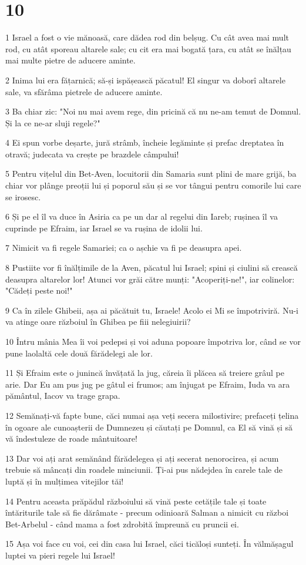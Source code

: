 \chapter{10}

\par 1 Israel a fost o vie mănoasă, care dădea rod din belșug. Cu cât avea mai mult rod, cu atât sporeau altarele sale; cu cit era mai bogată țara, cu atât se înălțau mai multe pietre de aducere aminte.
\par 2 Inima lui era fățarnică; să-și ispășească păcatul! El singur va doborî altarele sale, va sfărâma pietrele de aducere aminte.
\par 3 Ba chiar zic: "Noi nu mai avem rege, din pricină că nu ne-am temut de Domnul. Și la ce ne-ar sluji regele?"
\par 4 Ei spun vorbe deșarte, jură strâmb, încheie legăminte și prefac dreptatea în otravă; judecata va crește pe brazdele câmpului!
\par 5 Pentru vițelul din Bet-Aven, locuitorii din Samaria sunt plini de mare grijă, ba chiar vor plânge preoții lui și poporul său și se vor tângui pentru comorile lui care se irosesc.
\par 6 Și pe el îl va duce în Asiria ca pe un dar al regelui din Iareb; rușinea îl va cuprinde pe Efraim, iar Israel se va rușina de idolii lui.
\par 7 Nimicit va fi regele Samariei; ca o așchie va fi pe deasupra apei.
\par 8 Pustiite vor fi înălțimile de la Aven, păcatul lui Israel; spini și ciulini să crească deasupra altarelor lor! Atunci vor grăi către munți: "Acoperiți-ne!", iar colinelor: "Cădeți peste noi!"
\par 9 Ca în zilele Ghibeii, așa ai păcătuit tu, Israele! Acolo ei Mi se împotriviră. Nu-i va atinge oare războiul în Ghibea pe fiii nelegiuirii?
\par 10 Întru mânia Mea îi voi pedepsi și voi aduna popoare împotriva lor, când se vor pune laolaltă cele două fărădelegi ale lor.
\par 11 Și Efraim este o junincă învățată la jug, căreia îi plăcea să treiere grâul pe arie. Dar Eu am pus jug pe gâtul ei frumos; am înjugat pe Efraim, Iuda va ara pământul, Iacov va trage grapa.
\par 12 Semănați-vă fapte bune, căci numai așa veți secera milostivire; prefaceți țelina în ogoare ale cunoașterii de Dumnezeu și căutați pe Domnul, ca El să vină și să vă îndestuleze de roade mântuitoare!
\par 13 Dar voi ați arat semănând fărădelegea și ați secerat nenorocirea, și acum trebuie să mâncați din roadele minciunii. Ți-ai pus nădejdea în carele tale de luptă și în mulțimea vitejilor tăi!
\par 14 Pentru aceasta prăpădul războiului să vină peste cetățile tale și toate întăriturile tale să fie dărâmate - precum odinioară Salman a nimicit cu război Bet-Arbelul - când mama a fost zdrobită împreună cu pruncii ei.
\par 15 Așa voi face cu voi, cei din casa lui Israel, căci ticăloși sunteți. În vălmășagul luptei va pieri regele lui Israel!

